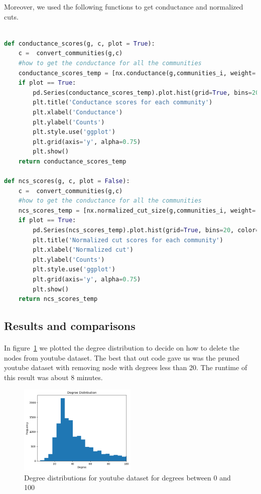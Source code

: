 \documentclass[letterpaper, 11pt]{article}
\newcommand{\1}{\mathds{1}}	%
\theoremstyle{definition}
\begin{document}
Moreover, we used the following functions to get conductance and normalized cuts.
\begin{lstlisting}[language=python, caption={Functions for conductance and normalized cuts}, label={lst:Pycode}]

def conductance_scores(g, c, plot = True):
    c =  convert_communities(g,c)
    #how to get the conductance for all the communities
    conductance_scores_temp = [nx.conductance(g,communities_i, weight='weight') for communities_i in c]
    if plot == True:
        pd.Series(conductance_scores_temp).plot.hist(grid=True, bins=20, color='deepskyblue')
        plt.title('Conductance scores for each community')
        plt.xlabel('Conductance')
        plt.ylabel('Counts')
        plt.style.use('ggplot')
        plt.grid(axis='y', alpha=0.75)
        plt.show()
    return conductance_scores_temp
    
def ncs_scores(g, c, plot = False):
    c =  convert_communities(g,c)
    #how to get the conductance for all the communities
    ncs_scores_temp = [nx.normalized_cut_size(g,communities_i, weight='weight') for communities_i in c]
    if plot == True:
        pd.Series(ncs_scores_temp).plot.hist(grid=True, bins=20, color='deepskyblue')
        plt.title('Normalized cut scores for each community')
        plt.xlabel('Normalized cut')
        plt.ylabel('Counts')
        plt.style.use('ggplot')
        plt.grid(axis='y', alpha=0.75)
        plt.show()
    return ncs_scores_temp
\end{lstlisting}



\newpage
\subsection*{Results and comparisons}
\paragraph{}In figure~\ref{fig:youtube_prune} we plotted the degree distribution to decide on how to delete the nodes from youtube dataset. The best that out code gave us was the pruned youtube dataset with removing node with degrees less than 20. The runtime of this result was about 8 minutes.

\begin{figure}[h]
\centering
\includegraphics[width=0.5\textwidth]{output3.png}
\captionsetup{justification=centering,margin=0.5cm}
\caption{Degree distributions for youtube dataset for degrees between 0 and 100}
\label{fig:youtube_prune}
\end{figure}
\end{document}
